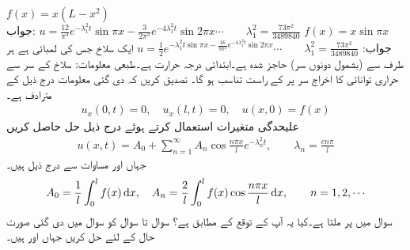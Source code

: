 \quad
$f(x)=x(L-x^2)$\\
جواب:\quad
$u=\tfrac{12}{\pi^3}e^{-\lambda_1^2t}\sin \pi x-\tfrac{3}{2\pi^3}e^{-4\lambda_1^2t}\sin 2\pi x\cdots\quad \quad \lambda_1^2=\tfrac{73\pi^2}{3489840}$
\quad
$f(x)=x\sin \pi x$\\
جواب:\quad
$u=\tfrac{1}{2}e^{-\lambda_1^2t\sin \pi x-\tfrac{16}{9\pi^2}e^{-4\lambda_1^2t}\sin 2\pi x}\cdots \quad \quad \lambda_1^2=\tfrac{73\pi^2}{3489840}$
\quad
ایک سلاخ جس کی لمبائی  ہے  ہر طرف سے (بشمول دونوں سر) حاجز شدہ ہے۔ابتدائی درجہ حرارت  ہے۔طبعی معلومات: سلاخ کے سر سے حراری توانائی کا اخراج سر پر   کے راست تناسب ہو گا۔ تصدیق کریں کہ دی گئی  معلومات درج ذیل کے مترادف ہے۔
\begin{align*}
u_x(0,t)=0,\quad u_x(l,t)=0,\quad u(x,0)=f(x)
\end{align*}
علیحدگی متغیرات استعمال کرتے ہوئے درج ذیل حل حاصل کریں
\begin{align*}
u(x,t)=A_0+\sum_{n=1}^{\infty} A_n\cos\frac{n\pi x}{l}e^{-\lambda_n^2 t},\quad \quad \lambda_n=\tfrac{cn\pi}{l}
\end{align*}
جہاں  اور  مساوات  سے  درج ذیل ہیں۔
\begin{align*}
A_0=\frac{1}{l}\int_0^l f(x)\dif x,\quad A_n=\frac{2}{l}\int_0^l f(x)\cos \frac{n\pi x}{l}\dif x,\quad \quad n=1,2,\cdots
\end{align*}
\quad
سوال  میں  پر  ملتا ہے۔کیا یہ آپ کے توقع کے مطابق ہے؟
سوال  تا سوال  کو سوال  میں دی گئی صورت حال کے لئے حل کریں جہاں   اور  ہیں۔

